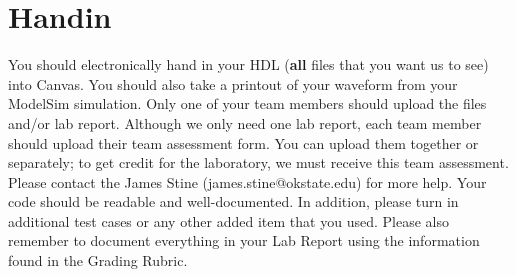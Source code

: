 \documentclass{article}
\begin{document}
\section{Handin}

You should electronically hand in your HDL (\textbf{all} files that you want
us to see) into Canvas.
You should also take a printout of your waveform 
from your ModelSim simulation.  
Only one of your team members should upload
the files and/or lab report. Although we only need one lab report,
each team member should upload their team
assessment form.  You can upload them together or separately; to get
credit for the laboratory, we must receive this team assessment.
Please contact
the James Stine (james.stine@okstate.edu) 
for more help.  Your
code should be
readable and well-documented. In addition, please turn in additional
test cases or any other added item that you used. 
Please also remember to document everything in your Lab Report using
the information found in the Grading Rubric.



\end{document}
